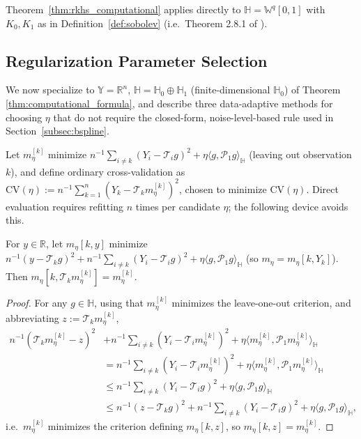 Theorem~\ref{thm:rkhs_computational} applies directly to $\mathbb{H}=
\mathbb{W}^q[0,1]$ with $K_0,K_1$ as in Definition~\ref{def:sobolev} (i.e.\
Theorem 2.8.1 of \cite{hsingeubank2015}).

\subsection{Regularization Parameter Selection}
\label{subsec:reg_param_selection}

We now specialize to $\mathbb{Y}=\mathbb{R}^n$, $\mathbb{H}=\mathbb{H}_0
\oplus\mathbb{H}_1$ (finite-dimensional $\mathbb{H}_0$) of Theorem
\ref{thm:computational_formula}, and describe three data-adaptive methods
for choosing $\eta$ that do not require the closed-form, noise-level-based
rule used in Section~\ref{subsec:bspline}.

Let $m_\eta^{[k]}$ minimize $n^{-1}\sum_{i\neq k}(Y_i-\mathcal{T}_ig)^2+
\eta\langle g,\mathcal{P}_1g\rangle_{\mathbb{H}}$ (leaving out
observation $k$), and define ordinary cross-validation as $\mathrm{CV}
(\eta) := n^{-1}\sum_{k=1}^n(Y_k-\mathcal{T}_km_\eta^{[k]})^2$, chosen to
minimize $\mathrm{CV}(\eta)$. Direct evaluation requires refitting $n$
times per candidate $\eta$; the following device avoids this.

\begin{lemma}
\label{lem:leave_one_out}
For $y\in\mathbb{R}$, let $m_\eta[k,y]$ minimize $n^{-1}(y-\mathcal{T}_kg)^2
+n^{-1}\sum_{i\neq k}(Y_i-\mathcal{T}_ig)^2+\eta\langle g,\mathcal{P}_1g
\rangle_{\mathbb{H}}$ (so $m_\eta=m_\eta[k,Y_k]$). Then
$m_\eta[k,\mathcal{T}_km_\eta^{[k]}] = m_\eta^{[k]}$.
\end{lemma}

\begin{proof}
For any $g\in\mathbb{H}$, using that $m_\eta^{[k]}$ minimizes the
leave-one-out criterion, and abbreviating $z:=\mathcal{T}_km_\eta^{[k]}$,
\begin{align*}
n^{-1}(\mathcal{T}_km_\eta^{[k]}-z)^2 &+ n^{-1}\sum_{i\neq k}(Y_i-
\mathcal{T}_im_\eta^{[k]})^2+\eta\langle m_\eta^{[k]},\mathcal{P}_1
m_\eta^{[k]}\rangle_{\mathbb{H}} \\
&= n^{-1}\sum_{i\neq k}(Y_i-\mathcal{T}_im_\eta^{[k]})^2+\eta\langle
m_\eta^{[k]},\mathcal{P}_1m_\eta^{[k]}\rangle_{\mathbb{H}} \\
&\leq n^{-1}\sum_{i\neq k}(Y_i-\mathcal{T}_ig)^2+\eta\langle g,\mathcal{P}_1
g\rangle_{\mathbb{H}} \\
&\leq n^{-1}(z-\mathcal{T}_kg)^2+n^{-1}\sum_{i\neq k}(Y_i-\mathcal{T}_ig)^2
+\eta\langle g,\mathcal{P}_1g\rangle_{\mathbb{H}},
\end{align*}
i.e.\ $m_\eta^{[k]}$ minimizes the criterion defining $m_\eta[k,z]$, so
$m_\eta[k,z]=m_\eta^{[k]}$.
\end{proof}

